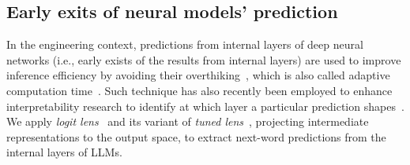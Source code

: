 \subsection{Early exits of neural models' prediction}
\label{subsec:adaptive}
In the engineering context, predictions from internal layers of deep neural networks (i.e., early exists of the results from internal layers) are used to improve inference efficiency by avoiding their overthiking~\cite{Graves2016-dp,Banino2021-oq}, which is also called adaptive computation time~\cite{icml19shallowdeepnetworks,Zhou2020-vz}. Such technique has also recently been employed to enhance interpretability research to identify at which layer a particular prediction shapes~\cite{logitlens,dar-etal-2023-analyzing,belrose2023eliciting}. 
We apply \textit{logit lens}~\cite{logitlens} and its variant of \textit{tuned lens}~\cite{belrose2023eliciting}, projecting intermediate representations to the output space, to extract next-word predictions from the internal layers of LLMs.